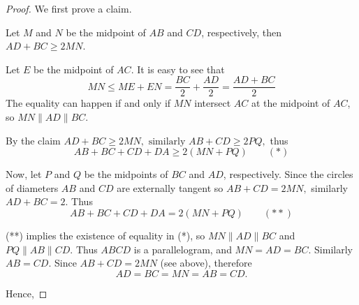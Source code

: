 \documentclass{article}
\begin{document}
\begin{proof}
    We first prove a claim.
    \begin{claim*}
        Let $M$ and $N$ be the midpoint of $AB$ and $CD$, respectively, then $AD+ BC \ge 2MN.$
    \end{claim*}

    \begin{subproof}
        Let $E$ be the midpoint of $AC.$ It is easy to see that 
        \[
            MN \le ME+EN = \frac{BC}{2} + \frac{AD}{2} = \frac{AD+BC}{2}
        \]
        The equality can happen if and only if $MN$ intersect $AC$ at the midpoint of $AC$, so $MN \parallel AD \parallel BC.$
    \end{subproof}
    By the claim $AD+BC \ge 2MN, \text{\ similarly\ } AB+CD \ge 2PQ,$ thus 
    \[ 
        AB+BC+CD+DA \ge 2(MN+PQ) \qquad (*)
    \]
   
    Now, let $P$ and $Q$ be the midpoints of $BC$ and $AD$, respectively.
    Since the circles of diameters $AB$ and $CD$ are externally tangent so $AB+CD = 2MN,$ similarly $AD+BC = 2.$
    Thus 
    \[ 
        AB+BC+CD+DA = 2(MN+PQ) \qquad (**)
    \]

    (**) implies the existence of equality in (*), so $MN \parallel AD \parallel BC$ and $PQ \parallel AB \parallel CD$.
    Thus $ABCD$ is a parallelogram, and $MN = AD = BC.$ Similarly $AB=CD.$ Since $AB +CD = 2MN$ (see above), therefore
    \[
        AD = BC = MN = AB = CD.
    \]

    Hence, 
\end{proof}
\end{document}
